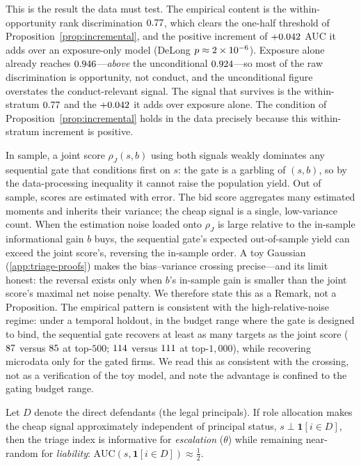 This is the result the data must test. The empirical content is
the within-opportunity rank discrimination
$0.77$, which clears the one-half threshold of
Proposition~\ref{prop:incremental}, and the positive increment of
$+0.042$ AUC it adds over an exposure-only model (DeLong
$p\approx2\times10^{-6}$). Exposure alone already reaches
$0.946$---\emph{above} the unconditional
$0.924$---so most of the raw discrimination is
opportunity, not conduct, and the unconditional figure overstates
the conduct-relevant signal. The signal that survives is the
within-stratum $0.77$ and the $+0.042$
it adds over exposure alone. The condition of
Proposition~\ref{prop:incremental} holds in the data precisely
because this within-stratum increment is positive.

\begin{remark}
\label{rem:oos}
In sample, a joint score $\rho_J(s,b)$ using both signals weakly
dominates any sequential gate that conditions first on $s$: the
gate is a garbling of $(s,b)$, so by the data-processing
inequality it cannot raise the population yield. Out of sample,
scores are estimated with error. The bid score aggregates many
estimated moments and inherits their variance; the cheap signal is
a single, low-variance count. When the estimation noise loaded
onto $\rho_J$ is large relative to the in-sample informational
gain $b$ buys, the sequential gate's expected out-of-sample yield
can exceed the joint score's, reversing the in-sample order. A toy
Gaussian (\ref{app:triage-proofs}) makes the bias--variance
crossing precise---and its limit honest: the reversal exists only
when $b$'s in-sample gain is smaller than the joint score's
maximal net noise penalty. We therefore state this as a Remark,
not a Proposition. The empirical pattern is consistent with the
high-relative-noise regime: under a temporal holdout, in the
budget range where the gate is designed to bind, the sequential
gate recovers at least as many targets as the joint score
($87$ versus $85$ at
top-$500$; $114$ versus $111$ at
top-$1{,}000$), while recovering microdata only for the gated
firms. We read this as consistent with the crossing, not as a
verification of the toy model, and note the advantage is confined
to the gating budget range.
\end{remark}

\begin{corollary}
\label{cor:separation}
Let $D$ denote the direct defendants (the legal principals). If
role allocation makes the cheap signal approximately independent
of principal status, $s\perp\mathbf{1}[i\in D]$, then the triage
index is informative for \emph{escalation} ($\theta$) while
remaining near-random for \emph{liability}:
$\mathrm{AUC}(s,\mathbf{1}[i\in D])\approx\tfrac12$.
\end{corollary}

